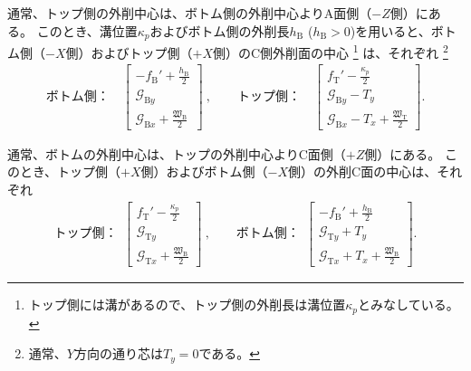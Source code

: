 通常、トップ側の外削中心は、ボトム側の外削中心よりA面側（$-Z$側）にある。
このとき、溝位置$\kappa_p$およびボトム側の外削長$h_\mathrm B$ ($h_\mathrm B > 0$)を用いると、ボトム側（$-X$側）およびトップ側（$+X$側）のC側外削面の中心
\footnote{トップ側には溝があるので、トップ側の外削長は溝位置$\kappa_p$とみなしている。}
は、それぞれ
\footnote{通常、$Y$方向の通り芯は$T_y = 0$である。}
\begin{align*}
  \text{ボトム側：}\quad
  \left[
    \begin{array}{c}
      \displaystyle -f_\mathrm B'+\frac{h_\mathrm B}2\\[5pt]
      \mathcal G_{\mathrm By}\\[3pt]
      \displaystyle \mathcal G_{\mathrm Bx}+\frac{\mathfrak W_\mathrm B}2
    \end{array}
    \right]~, \qquad
  \text{トップ側：}\quad
  \left[
    \begin{array}{c}
      \displaystyle f_\mathrm T'-\frac{\kappa_p}2\\[5pt]
      \mathcal G_{\mathrm By}-T_y\\[3pt]
      \displaystyle \mathcal G_{\mathrm Bx}-T_x+\frac{\mathfrak W_\mathrm T}2
    \end{array}
  \right].
\end{align*}



通常、ボトムの外削中心は、トップの外削中心よりC面側（$+Z$側）にある。
このとき、トップ側（$+X$側）およびボトム側（$-X$側）の外削C面の中心は、それぞれ
\begin{align*}
  \text{トップ側：}~~
  \left[
    \begin{array}{c}
      \displaystyle f_\mathrm T'-\frac{\kappa_p}2\\[5pt]
      \mathcal G_{\mathrm Ty}\\[3pt]
      \displaystyle \mathcal G_{\mathrm Tx}+\frac{\mathfrak W_\mathrm B}2
    \end{array}
    \right]~, \qquad
  \text{ボトム側：}~~
  \left[
    \begin{array}{c}
      \displaystyle -f_\mathrm B'+\frac{h_\mathrm B}2\\[5pt]
      \mathcal G_{\mathrm Ty}+T_y\\[3pt]
      \displaystyle \mathcal G_{\mathrm Tx}+T_x+\frac{\mathfrak W_\mathrm B}2
    \end{array}
  \right].
\end{align*}



